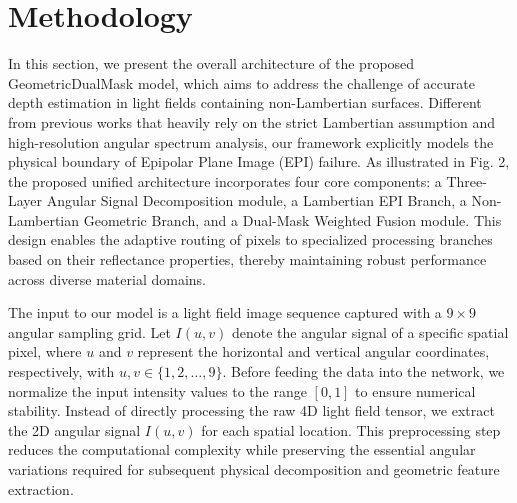 \section{Methodology}

In this section, we present the overall architecture of the proposed GeometricDualMask model, which aims to address the challenge of accurate depth estimation in light fields containing non-Lambertian surfaces. Different from previous works that heavily rely on the strict Lambertian assumption and high-resolution angular spectrum analysis, our framework explicitly models the physical boundary of Epipolar Plane Image (EPI) failure. As illustrated in Fig. 2, the proposed unified architecture incorporates four core components: a Three-Layer Angular Signal Decomposition module, a Lambertian EPI Branch, a Non-Lambertian Geometric Branch, and a Dual-Mask Weighted Fusion module. This design enables the adaptive routing of pixels to specialized processing branches based on their reflectance properties, thereby maintaining robust performance across diverse material domains.

The input to our model is a light field image sequence captured with a $9 \times 9$ angular sampling grid. Let $I(u,v)$ denote the angular signal of a specific spatial pixel, where $u$ and $v$ represent the horizontal and vertical angular coordinates, respectively, with $u, v \in \{1, 2, \dots, 9\}$. Before feeding the data into the network, we normalize the input intensity values to the range $[0, 1]$ to ensure numerical stability. Instead of directly processing the raw 4D light field tensor, we extract the 2D angular signal $I(u,v)$ for each spatial location. This preprocessing step reduces the computational complexity while preserving the essential angular variations required for subsequent physical decomposition and geometric feature extraction.

